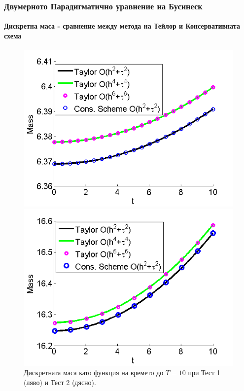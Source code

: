 \documentclass{beamer}
\begin{document}
\begin{frame}
\frametitle{Двумерното Парадигматично уравнение на Бусинеск}
\framesubtitle{Дискретна маса - сравнение между метода на Тейлор и Консервативната схема}

\begin{figure}[ht]\vspace{0.4cm}
	\begin{minipage}[b]{0.49\linewidth}
		 \includegraphics[width=\linewidth]{Mass_bt3_c045_h005_Oh2_Oh4_Oh6.png}
	\end{minipage}	
	\begin{minipage}[b]{0.49\linewidth}
		\includegraphics[width=\linewidth]{Mass_bt1_c090_h010_Oh2_Oh4_Oh6.png}	
	\end{minipage}
\caption{Дискретната маса като функция на времето до $T = 10$ при Тест 1 (ляво) и Тест 2 (дясно).}
\label{Test1En}
\end{figure}

\end{frame}
\end{document}
